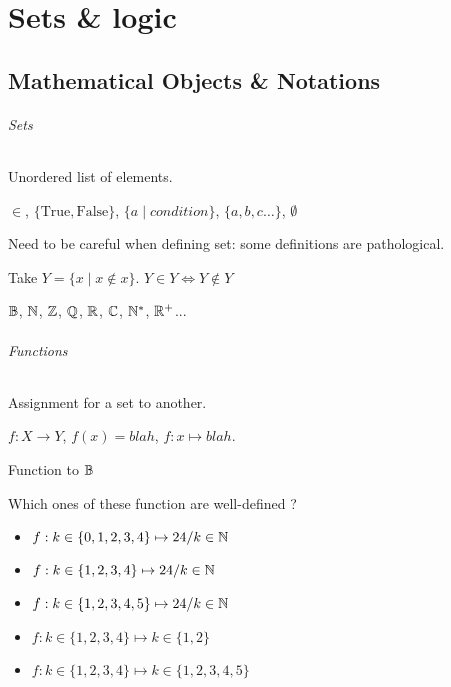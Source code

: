 \chapter{Sets \& logic}

\section{Mathematical Objects \& Notations}
\subparagraph{Sets}
\begin{definition}[Sets]
	Unordered list of elements.
\end{definition}
\begin{notation}[Sets]
	$\in$, $\{ \text{True}, \text{False} \}$, $\{ a \mid condition \}$, $\{ a, b, c \dots \}$, $\emptyset$
\end{notation}
Need to be careful when defining set: some definitions are pathological.
\begin{remark}
	Take $Y = \{x \mid x \not\in x\}$.
	$Y \in Y \iff Y \not\in Y$
\end{remark}
\begin{notation}
	$\mathbb{B}$, $\mathbb{N}$, $\mathbb{Z}$, $\mathbb{Q}$, $\mathbb{R}$, $\mathbb{C}$, $\mathbb{N}^*$, $\mathbb{R}^+$...
\end{notation}

\subparagraph{Functions}
\begin{definition}[Functions]
	Assignment for a set to another.
\end{definition}
\begin{notation}[Function]
	$f: X \to Y$, $f(x)=blah$, $f: x \mapsto blah$.
\end{notation}
\begin{definition}[Predicate]
	Function to $\mathbb{B}$
\end{definition}
\begin{question}
	Which ones of these function are well-defined ?
	\begin{itemize}
		\item $f:k\in\{0,1,2,3,4\}\mapsto 24/k\in \mathbb{N}$
		\item $f:k\in \{1,2,3,4\}\mapsto 24/k\in \mathbb{N}$
		\item $f:k\in \{1,2,3,4,5\}\mapsto 24/k\in \mathbb{N}$
		\item $f:k\in \{1,2,3,4\}\mapsto k\in \{1,2\}$
		\item $f:k\in \{1,2,3,4\}\mapsto k\in \{1,2,3,4,5\}$
	\end{itemize}
\end{question}

